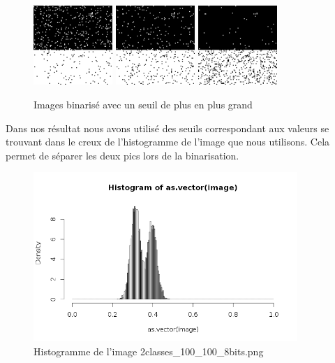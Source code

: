 \documentclass[a4paper,11pt]{article}
\begin{document}
  \begin{figure}[H]
    \center
    \includegraphics[width=3cm]{resultat/bin35.png}
    \includegraphics[width=3cm]{resultat/bin36.png}
    \includegraphics[width=3cm]{resultat/bin37.png}
    \caption{Images binarisé avec un seuil de plus en plus grand}
  \end{figure}
  
  Dans nos résultat nous avons utilisé des seuils correspondant aux valeurs se trouvant dans le creux
  de l'histogramme de l'image que nous utilisons. Cela permet de séparer les deux pics lors de la 
  binarisation.\\
  
  \begin{figure}[H]
    \center
    \includegraphics[width=10cm]{resultat/hist_image_principal.png}
    \caption{Histogramme de l'image 2classes\_100\_100\_8bits.png}
  \end{figure}
\end{document}
